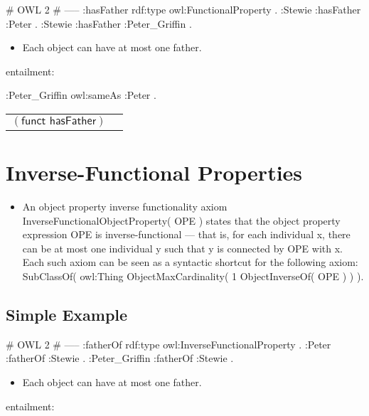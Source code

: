 \documentclass{llncs}
\newenvironment{DL}{
	\begin{center}
  \begin{tabular}{r l}

}{
  \end{tabular}
	\end{center}
}
\begin{document}
\begin{ex}
# OWL 2
# -----
:hasFather rdf:type owl:FunctionalProperty . 	
:Stewie :hasFather :Peter . 	
:Stewie :hasFather :Peter_Griffin . 
\end{ex}

\begin{itemize}
	\item Each object can have at most one father. 
\end{itemize}

entailment:

\begin{ex}
:Peter_Griffin owl:sameAs :Peter .  
\end{ex}

\begin{DL}
$(\textsf{funct } \textsf{hasFather})$
\end{DL}

\section{Inverse-Functional Properties}



\begin{itemize}
	\item An object property inverse functionality axiom InverseFunctionalObjectProperty( OPE ) states that the object property expression OPE is inverse-functional — that is, for each individual x, there can be at most one individual y such that y is connected by OPE with x. Each such axiom can be seen as a syntactic shortcut for the following axiom: SubClassOf( owl:Thing ObjectMaxCardinality( 1 ObjectInverseOf( OPE ) ) ).
\end{itemize}

\subsection{Simple Example}

\begin{ex}
# OWL 2
# -----
:fatherOf rdf:type owl:InverseFunctionalProperty . 	
:Peter :fatherOf :Stewie .
:Peter_Griffin :fatherOf :Stewie .
\end{ex}

\begin{itemize}
	\item Each object can have at most one father. 
\end{itemize}

entailment:
\end{document}

